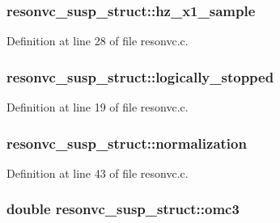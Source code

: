 \subsubsection[{\texorpdfstring{hz\+\_\+x1\+\_\+sample}{hz_x1_sample}}]{ resonvc\+\_\+susp\+\_\+struct\+::hz\+\_\+x1\+\_\+sample}\hypertarget{structresonvc__susp__struct_abd3403d924f3f9c088fd6adb6b980f6d}{}\label{structresonvc__susp__struct_abd3403d924f3f9c088fd6adb6b980f6d}


Definition at line 28 of file resonvc.\+c.

\subsubsection[{\texorpdfstring{logically\+\_\+stopped}{logically_stopped}}]{ resonvc\+\_\+susp\+\_\+struct\+::logically\+\_\+stopped}\hypertarget{structresonvc__susp__struct_a55c7ee1a3465e9c51f8e59506a861e9d}{}\label{structresonvc__susp__struct_a55c7ee1a3465e9c51f8e59506a861e9d}


Definition at line 19 of file resonvc.\+c.

\subsubsection[{\texorpdfstring{normalization}{normalization}}]{ resonvc\+\_\+susp\+\_\+struct\+::normalization}\hypertarget{structresonvc__susp__struct_a429a7736fb490257be0766a410bdef5e}{}\label{structresonvc__susp__struct_a429a7736fb490257be0766a410bdef5e}


Definition at line 43 of file resonvc.\+c.

\subsubsection[{\texorpdfstring{omc3}{omc3}}]{\setlength{\rightskip}{0pt plus 5cm}double resonvc\+\_\+susp\+\_\+struct\+::omc3}\hypertarget{structresonvc__susp__struct_a3e4ac0c233b8e75089a1457d64f8db1d}{}\label{structresonvc__susp__struct_a3e4ac0c233b8e75089a1457d64f8db1d}


